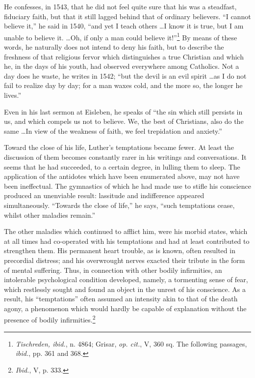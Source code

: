 He confesses, in 1543, that he did not feel quite sure that his was a
steadfast, fiduciary faith, but that it still lagged behind that of
ordinary believers. “I cannot believe it,” he said in 1540, “and yet
I teach others \dots I know it is true, but I am unable to believe it.
\dots Oh, if only a man could believe it!”\footnote
{\textit{Tischreden, ibid.}, n. 4864; Grisar, \textit{op. cit.}, V, 360 sq. The following passages, \textit{ibid.}, pp.
361 and 368.}
By means of these words,
he naturally does not intend to deny his faith, but to describe the
freshness of that religious fervor which distinguishes a true Christian
and which he, in the days of his youth, had observed everywhere
among Catholics. Not a day does he waste, he writes in 1542; “but
the devil is an evil spirit \dots as I do not fail to realize day by day;
for a man waxes cold, and the more so, the longer he lives.”

Even in his last sermon at Eisleben, he speaks of “the sin which
still persists in us, and which compels us not to believe. We, the best
of Christians, also do the same \dots In view of the weakness of faith,
we feel trepidation and anxiety.”

Toward the close of his life, Luther’s temptations became fewer.
At least the discussion of them becomes constantly rarer in his writings
and conversations. It seems that he had succeeded, to a certain
degree, in lulling them to sleep. The application of the antidotes
which have been enumerated above, may not have been ineffectual.
The gymnastics of which he had made use to stifle his conscience
produced an unenviable result: lassitude and indifference appeared
simultaneously. “Towards the close of life,” he says, “such temptations
cease, whilst other maladies remain.”

The other maladies which continued to afflict him, were his morbid
states, which at all times had co-operated with his temptations and
had at least contributed to strengthen them. His permanent heart
trouble, as is known, often resulted in precordial distress; and his
overwrought nerves exacted their tribute in the form of mental
suffering. Thus, in connection with other bodily infirmities, an intolerable
psychological condition developed, namely, a tormenting
sense of fear, which restlessly sought and found an object in the unrest
of his conscience. As a result, his “temptations” often assumed an
intensity akin to that of the death agony, a phenomenon which would
hardly be capable of explanation without the presence of bodily infirmities.\footnote{\textit{Ibid.}, V, p. 333.}


